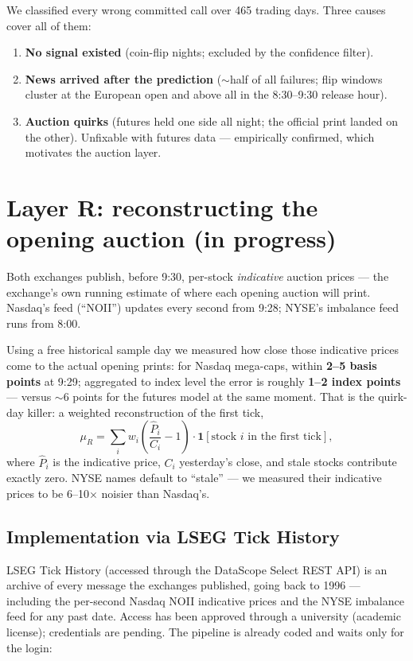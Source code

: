 \documentclass[11pt,a4paper]{article}
\begin{document}
We classified every wrong committed call over 465 trading days. Three causes
cover all of them:
\begin{enumerate}
\item \textbf{No signal existed} (coin-flip nights; excluded by the confidence
filter).
\item \textbf{News arrived after the prediction} ($\sim$half of all failures;
flip windows cluster at the European open and above all in the 8:30--9:30
release hour).
\item \textbf{Auction quirks} (futures held one side all night; the official
print landed on the other). Unfixable with futures data --- empirically
confirmed, which motivates the auction layer.
\end{enumerate}

\section{Layer R: reconstructing the opening auction (in progress)}

Both exchanges publish, before 9:30, per-stock \emph{indicative} auction prices
--- the exchange's own running estimate of where each opening auction will
print. Nasdaq's feed (``NOII'') updates every second from 9:28; NYSE's
imbalance feed runs from 8:00.

Using a free historical sample day we measured how close those indicative
prices come to the actual opening prints: for Nasdaq mega-caps, within
\textbf{2--5 basis points} at 9:29; aggregated to index level the error is
roughly \textbf{1--2 index points} --- versus $\sim$6 points for the futures
model at the same moment. That is the quirk-day killer: a weighted
reconstruction of the first tick,
\[
\mu_R = \sum_i w_i \left(\frac{\hat{P}_i}{C_i} - 1\right)\cdot
\mathbf{1}[\text{stock } i \text{ in the first tick}],
\]
where $\hat{P}_i$ is the indicative price, $C_i$ yesterday's close, and stale
stocks contribute exactly zero. NYSE names default to ``stale'' --- we measured
their indicative prices to be 6--10$\times$ noisier than Nasdaq's.

\subsection{Implementation via LSEG Tick History}

LSEG Tick History (accessed through the DataScope Select REST API) is an
archive of every message the exchanges published, going back to 1996 ---
including the per-second Nasdaq NOII indicative prices and the NYSE imbalance
feed for any past date. Access has been approved through a university
(academic license); credentials are pending. The pipeline is already coded and
waits only for the login:
\end{document}
